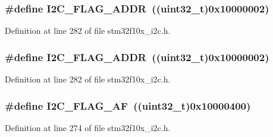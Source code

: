 \subsubsection[{\texorpdfstring{I2\+C\+\_\+\+F\+L\+A\+G\+\_\+\+A\+D\+DR}{I2C_FLAG_ADDR}}]{\setlength{\rightskip}{0pt plus 5cm}\#define I2\+C\+\_\+\+F\+L\+A\+G\+\_\+\+A\+D\+DR~(({\bf uint32\+\_\+t})0x10000002)}\hypertarget{group___i2_c__flags__definition_ga5472d1196e934e0cc471aba8f66af416}{}\label{group___i2_c__flags__definition_ga5472d1196e934e0cc471aba8f66af416}


Definition at line 282 of file stm32f10x\+\_\+i2c.\+h.

\subsubsection[{\texorpdfstring{I2\+C\+\_\+\+F\+L\+A\+G\+\_\+\+A\+D\+DR}{I2C_FLAG_ADDR}}]{\setlength{\rightskip}{0pt plus 5cm}\#define I2\+C\+\_\+\+F\+L\+A\+G\+\_\+\+A\+D\+DR~(({\bf uint32\+\_\+t})0x10000002)}\hypertarget{group___i2_c__flags__definition_ga5472d1196e934e0cc471aba8f66af416}{}\label{group___i2_c__flags__definition_ga5472d1196e934e0cc471aba8f66af416}


Definition at line 282 of file stm32f10x\+\_\+i2c.\+h.

\subsubsection[{\texorpdfstring{I2\+C\+\_\+\+F\+L\+A\+G\+\_\+\+AF}{I2C_FLAG_AF}}]{\setlength{\rightskip}{0pt plus 5cm}\#define I2\+C\+\_\+\+F\+L\+A\+G\+\_\+\+AF~(({\bf uint32\+\_\+t})0x10000400)}\hypertarget{group___i2_c__flags__definition_ga2f89dbba9b964e6ade1480705e7a97d4}{}\label{group___i2_c__flags__definition_ga2f89dbba9b964e6ade1480705e7a97d4}


Definition at line 274 of file stm32f10x\+\_\+i2c.\+h.

